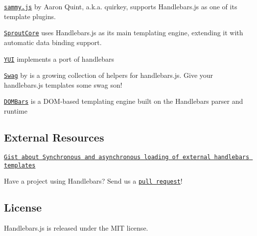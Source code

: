 \begin{DoxyItemize}
\item \href{http://github.com/quirkey/sammy}{\tt sammy.\+js} by Aaron Quint, a.\+k.\+a. quirkey, supports Handlebars.\+js as one of its template plugins.
\item \href{http://www.sproutcore.com}{\tt Sprout\+Core} uses Handlebars.\+js as its main templating engine, extending it with automatic data binding support.
\item \href{http://yuilibrary.com/yui/docs/handlebars/}{\tt Y\+U\+I} implements a port of handlebars
\item \href{https://github.com/elving/swag}{\tt Swag} by \href{https://github.com/elving}{\tt } is a growing collection of helpers for handlebars.\+js. Give your handlebars.\+js templates some swag son!
\item \href{https://github.com/blakeembrey/dombars}{\tt D\+O\+M\+Bars} is a D\+O\+M-\/based templating engine built on the Handlebars parser and runtime
\end{DoxyItemize}

\subsection*{External Resources }


\begin{DoxyItemize}
\item \href{https://gist.github.com/2287070}{\tt Gist about Synchronous and asynchronous loading of external handlebars templates}
\end{DoxyItemize}

Have a project using Handlebars? Send us a \href{https://github.com/wycats/handlebars.js/pull/new/master}{\tt pull request}!

\subsection*{License }

Handlebars.\+js is released under the M\+I\+T license. 
